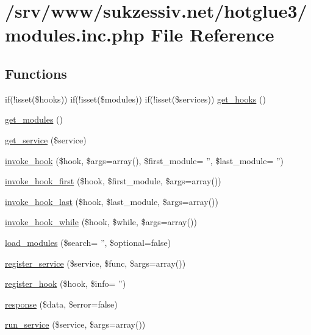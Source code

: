 \hypertarget{modules_8inc_8php}{
\section{/srv/www/sukzessiv.net/hotglue3/modules.inc.php File Reference}
\label{modules_8inc_8php}
}
\subsection*{Functions}
\begin{CompactItemize}
\item 
if(!isset(\$hooks)) if(!isset(\$modules)) if(!isset(\$services)) \hyperlink{modules_8inc_8php_dcaa12e356133b7fa0670571698b38cc}{get\_\-hooks} ()
\item 
\hyperlink{modules_8inc_8php_1b73e435e11b07906d0781b146b4aa21}{get\_\-modules} ()
\item 
\hyperlink{modules_8inc_8php_bf7633223c2fd4ecb199a8e0dc070802}{get\_\-service} (\$service)
\item 
\hyperlink{modules_8inc_8php_92ef7c094f294cfec43a3bb53227a21a}{invoke\_\-hook} (\$hook, \$args=array(), \$first\_\-module= '', \$last\_\-module= '')
\item 
\hyperlink{modules_8inc_8php_cac937809bdb98ce29616134e43050ed}{invoke\_\-hook\_\-first} (\$hook, \$first\_\-module, \$args=array())
\item 
\hyperlink{modules_8inc_8php_e1ff036fae9d272fe1d58dff8a9caed2}{invoke\_\-hook\_\-last} (\$hook, \$last\_\-module, \$args=array())
\item 
\hyperlink{modules_8inc_8php_66473fc9f24153d85053f1f9c6ed83e4}{invoke\_\-hook\_\-while} (\$hook, \$while, \$args=array())
\item 
\hyperlink{modules_8inc_8php_23f8be02dc2148a3c860119a1d6ea276}{load\_\-modules} (\$search= '', \$optional=false)
\item 
\hyperlink{modules_8inc_8php_e6ed600fb2ce39a4b0837bbb01fe8d6e}{register\_\-service} (\$service, \$func, \$args=array())
\item 
\hyperlink{modules_8inc_8php_d91a5f96df0655d782404170324e567d}{register\_\-hook} (\$hook, \$info= '')
\item 
\hyperlink{modules_8inc_8php_361058ff2a03c098045c4442440a2574}{response} (\$data, \$error=false)
\item 
\hyperlink{modules_8inc_8php_3d581f1636df2e24ffe7b013a12fb1db}{run\_\-service} (\$service, \$args=array())
\end{CompactItemize}


